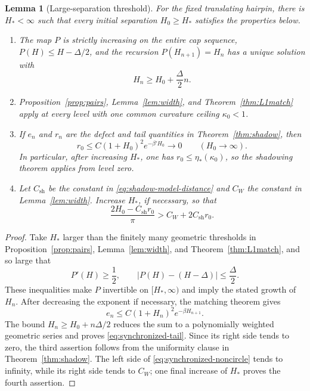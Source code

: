 \documentclass[11pt]{article}
\newtheorem{lemma}[theorem]{Lemma}
\theoremstyle{remark}
\begin{document}
\begin{lemma}[Large-separation threshold]\label{lem:synchronize}
For the fixed translating hairpin, there is \(H_*<\infty\) such that every
initial separation \(H_0\geq H_*\) satisfies the properties below.
\begin{enumerate}[label=\roman*.,leftmargin=*]
\item The map \(P\) is strictly increasing on the entire cap sequence,
      \(P(H)\leq H-\Delta/2\), and the recursion
      \(P(H_{n+1})=H_n\) has a unique solution with
      \[
        H_n\geq H_0+\frac{\Delta}{2}n.
      \]
\item Proposition~\ref{prop:pairs}, Lemma~\ref{lem:width}, and
      Theorem~\ref{thm:L1match} apply at every level with one common
      curvature ceiling \(\kappa_0<1\).
\item If \(e_n\) and \(r_n\) are the defect and tail quantities in
      Theorem~\ref{thm:shadow}, then
      \begin{equation}\label{eq:synchronized-tail}
       r_0\leq C(1+H_0)^2e^{-\beta' H_0}\longrightarrow0
       \qquad(H_0\to\infty).
      \end{equation}
      In particular, after increasing \(H_*\), one has
      \(r_0\leq\eta_*(\kappa_0)\), so the shadowing theorem applies from
      level zero.
\item Let \(C_{\mathrm{sh}}\) be the constant in
      \eqref{eq:shadow-model-distance} and \(C_W\) the constant in
      Lemma~\ref{lem:width}.  Increase \(H_*\), if necessary, so that
      \begin{equation}\label{eq:synchronized-noncircle}
       \frac{2H_0-C_{\mathrm{sh}}r_0}{\pi}
          > C_W+2C_{\mathrm{sh}}r_0.
      \end{equation}
\end{enumerate}
\end{lemma}

\begin{proof}
Take \(H_*\) larger than the finitely many geometric thresholds in
Proposition~\ref{prop:pairs}, Lemma~\ref{lem:width}, and
Theorem~\ref{thm:L1match}, and so large that
\[
 P'(H)\geq\frac12,
 \qquad
 |P(H)-(H-\Delta)|\leq\frac\Delta2.
\]
These inequalities make \(P\) invertible on \([H_*,\infty)\) and imply the
stated growth of \(H_n\).
After decreasing the exponent if necessary, the matching theorem gives
\[
 e_n\leq C(1+H_n)^2e^{-\beta H_{n+1}}.
\]
The bound \(H_n\geq H_0+n\Delta/2\) reduces the sum to a polynomially
weighted geometric series and proves \eqref{eq:synchronized-tail}.  Since its
right side tends to zero, the third assertion follows from the uniformity
clause in Theorem~\ref{thm:shadow}.  The left side of
\eqref{eq:synchronized-noncircle} tends to infinity, while its right side
tends to \(C_W\); one final increase of \(H_*\) proves the fourth assertion.
\end{proof}
\end{document}
